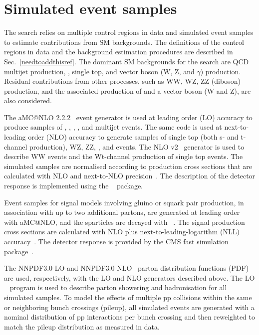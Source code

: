 \section{Simulated event samples}
\label{sec:simulation}


The search relies on multiple control regions in data and simulated
event samples to estimate contributions from SM backgrounds. The
definitions of the control regions in data and the background
estimation procedures are described in
Sec.~\ref{needtoaddthisref}. The dominant SM backgrounds for the
search are QCD multijet production, \ttbar, single top, and vector
boson (W, Z, and $\gamma$) production. Residual contributions from
other processes, such as WW, WZ, ZZ (diboson) production, and the
associated production of \ttbar and a vector boson (W and Z), are also
considered.

The  aMC@NLO 2.2.2~\cite{Alwall2014} event generator is used
at leading order (LO) accuracy to produce samples of \wj, \zj, \gj,
\ttbar, and multijet events. The same code is used at next-to-leading
order (NLO) accuracy to generate samples of single top (both s- and
t-channel production), WZ, ZZ, \ttw, and \ttz events. The NLO \POWHEG
v2~\cite{powheg, powheg_top_Wt} generator is used to describe WW
events and the Wt-channel production of single top events. The
simulated samples are normalised according to production cross
sections that are calculated with NLO and next-to-NLO
precision~\cite{nloxs, wphys, fewz, wwxs, top++, nlotop,
  powheg_top_Wt}. The description of the detector response is
implemented using the \GEANTfour~\cite{geant} package.

Event samples for signal models involving gluino or squark pair
production, in association with up to two additional partons, are
generated at leading order with  aMC@NLO, and the sparticles
are decayed with ~\cite{pythia}. The signal production cross
sections are calculated with NLO plus next-to-leading-logarithm (NLL)
accuracy~\cite{Beenakker:1996ch, PhysRevLett.102.111802,
  PhysRevD.80.095004, 1126-6708-2009-12-041,
  doi:10.1142/S0217751X11053560, susynlo}. The detector response is
provided by the CMS fast simulation package~\cite{fastsim}.

The \textsc{NNPDF}3.0 LO and \textsc{NNPDF}3.0 NLO~\cite{nnpdf} parton
distribution functions (PDF) are used, respectively, with the LO and
NLO generators described above. The LO ~\cite{pythia}
program is used to describe parton showering and hadronisation for all
simulated samples. To model the effects of multiple pp collisions
within the same or neighboring bunch crossings (pileup), all simulated
events are generated with a nominal distribution of pp interactions
per bunch crossing and then reweighted to match the pileup
distribution as measured in data.

